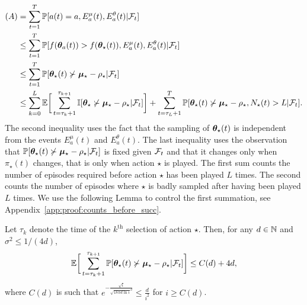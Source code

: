 \begin{align}
\label{eqn:a}
    (A)
    & = \sum_{t=1}^T \mathbb{P}[a(t) = a, E_a^\mu(t), E_a^\theta(t) | \mathcal{F}_t] \nonumber \\
    & \leq \sum_{t=1}^T \mathbb{P}[f(\boldsymbol{\theta}_a(t)) > f(\boldsymbol{\theta}_\star(t)), E_a^\mu(t), E_a^\theta(t) | \mathcal{F}_t] \nonumber \\
    & \leq \sum_{t=1}^T \mathbb{P}[\boldsymbol{\theta}_\star(t) \not\succ \boldsymbol{\mu}_\star - \rho_\star | \mathcal{F}_t] \nonumber \\
    & \leq \sum_{k=0}^{L} \mathbb{E} \bigg[ \sum_{t=\tau_k+1}^{\tau_{k+1}} \mathbb{I}[\boldsymbol{\theta}_\star \not\succ \boldsymbol{\mu}_\star - \rho_\star | \mathcal{F}_t] \bigg]
    + \sum_{t=\tau_L+1}^T \mathbb{P}[\boldsymbol{\theta}_\star(t) \not\succ \boldsymbol{\mu}_\star - \rho_\star, N_\star(t) > L | \mathcal{F}_t].
\end{align}
The second inequality uses the fact that the sampling of $\boldsymbol{\theta}_\star(t)$ is independent from the events $E_a^\mu(t)$ and $E_a^\theta(t)$. The last inequality uses the observation that $\mathbb{P}[\boldsymbol{\theta}_\star(t) \not\succ \boldsymbol{\mu}_\star - \rho_\star | \mathcal{F}_t]$ is fixed given $\mathcal{F}_t$ and that it changes only when $\pi_\star(t)$ changes, that is only when action $\star$ is played. The first sum counts the number of episodes required before action $\star$ has been played $L$ times. The second counts the number of episodes where $\star$ is badly sampled after having been played $L$ times. We use the following Lemma to control the first summation, see Appendix~\ref{app:proof:counts_before_succ}.

\begin{lemma}
\label{lem:counts_before_succ}
    Let $\tau_k$ denote the time of the $k^\mathrm{th}$ selection of action $\star$. Then, for any $d \in \mathbb{N}$ and $\sigma^2 \leq 1/(4d)$,
    \begin{align*}
        \mathbb{E} \bigg[ \sum_{t=\tau_k+1}^{\tau_{k+1}} \mathbb{P}[\boldsymbol{\theta}_\star(t) \not\succ \boldsymbol{\mu}_\star - \rho_\star | \mathcal{F}_t] \bigg]
        \leq C(d) + 4d,
    \end{align*}
    where $C(d)$ is such that $e^{-\frac{\sqrt{i}}{\sqrt{18 \pi d \ln i}^d}} \leq \frac{d}{i^2}$ for $i \geq C(d)$.
\end{lemma}

